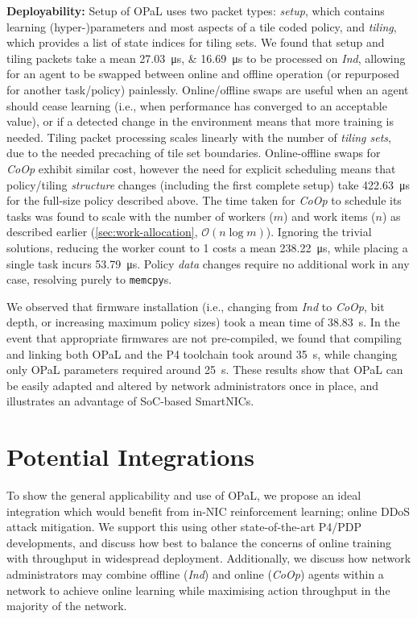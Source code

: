 \documentclass[
sigconf,natbib=false
]{acmart}
\newcommand{\fakepara}[1]{\noindent\textbf{#1:}}
\newcommand{\approachshort}{OPaL}
\newcommand{\Coopfw}{\emph{CoOp}}
\newcommand{\Indfw}{\emph{Ind}}
\begin{document}
\fakepara{Deployability}
Setup of \approachshort{} uses two packet types: \emph{setup}, which contains learning (hyper-)parameters and most aspects of a tile coded policy, and \emph{tiling}, which provides a list of state indices for tiling sets.
We found that setup and tiling packets take a mean \qtylist{27.03;16.69}{\micro\second} to be processed on \Indfw{}, allowing for an agent to be swapped between online and offline operation (or repurposed for another task/policy) painlessly.
Online/offline swaps are useful when an agent should cease learning (i.e., when performance has converged to an acceptable value), or if a detected change in the environment means that more training is needed.
Tiling packet processing scales linearly with the number of \emph{tiling sets}, due to the needed precaching of tile set boundaries.
Online-offline swaps for \Coopfw{} exhibit similar cost, however the need for explicit scheduling means that policy/tiling \emph{structure} changes (including the first complete setup) take \SI{422.63}{\micro\second} for the full-size policy described above.
The time taken for \Coopfw{} to schedule its tasks was found to scale with the number of workers ($m$) and work items ($n$) as described earlier (\cref{sec:work-allocation}, $\mathcal{O}{\left(n\log{m}\right)}$).
Ignoring the trivial solutions, reducing the worker count to \num{1} costs a mean \SI{238.22}{\micro\second}, while placing a single task incurs \SI{53.79}{\micro\second}.
Policy \emph{data} changes require no additional work in any case, resolving purely to \texttt{memcpy}s.

We observed that firmware installation (i.e., changing from \Indfw{} to \Coopfw{}, bit depth, or increasing maximum policy sizes) took a mean time of \SI{38.83}{\second}.
In the event that appropriate firmwares are not pre-compiled, we found that compiling and linking both \approachshort{} and the P4 toolchain took around \SI{35}{\second}, while changing only \approachshort{} parameters required around \SI{25}{\second}.
These results show that \approachshort{} can be easily adapted and altered by network administrators once in place, and illustrates an advantage of SoC-based SmartNICs.

\section{Potential Integrations}\label{sec:potential-integrations}
To show the general applicability and use of \approachshort{}, we propose an ideal integration which would benefit from in-NIC reinforcement learning; online DDoS attack mitigation.
We support this using other state-of-the-art P4/PDP developments, and discuss how best to balance the concerns of online training with throughput in widespread deployment.
Additionally, we discuss how network administrators may combine offline (\Indfw) and online (\Coopfw) agents within a network to achieve online learning while maximising action throughput in the majority of the network.
\end{document}
